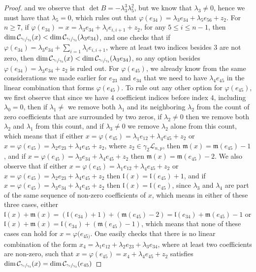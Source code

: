 \documentclass[12pt]{article}
\begin{document}
\begin{proof}
and we observe that $\det B=-\lambda_3^3\lambda_5^2$, but we know that $\lambda_3\neq 0$, hence we must have that $\lambda_5=0$, which rules out that $\varphi(e_{34})=\lambda_3 e_{34}+\lambda_5 e_{56}+z_2$. For $n\geq 7$, if $\varphi(e_{34})=x=\lambda_3 e_{34}+\lambda_i e_{i,i+1}+z_2$, for any $5\leq i\leq n-1$, then $\dim\mathcal{C}_{\sfrac{\gamma_1}{\gamma_3}}(x)<\dim\mathcal{C}_{\sfrac{\gamma_1}{\gamma_3}}(\lambda_3 e_{34})$, and one checks that if $\varphi(e_{34})=\lambda_3 e_{34}+\sum_{i=1}\lambda_i e_{i,i+1}$, where at least two indices besides $3$ are not zero, then $\dim\mathcal{C}_{\sfrac{\gamma_1}{\gamma_3}}(x)<\dim\mathcal{C}_{\sfrac{\gamma_1}{\gamma_3}}(\lambda_3 e_{34})$, so any option besides $\varphi(e_{34})=\lambda_3 e_{34}+z_2$ is ruled out. For $\varphi(e_{45})$, we already know from the same considerations we made earlier for $e_{23}$ and $e_{34}$ that we need to have $\lambda_4 e_{45}$ in the linear combination that forms $\varphi(e_{45})$. To rule out any other option for $\varphi(e_{45})$, we first observe that since we have $4$ coefficient indices before index $4$, including $\lambda_0=0$, then if $\lambda_1\neq$ we remove both $\lambda_1$ and its neighboring $\lambda_2$ from the count of zero coefficients that are surrounded by two zeros, if $\lambda_2\neq 0$ then we remove both $\lambda_2$ and $\lambda_1$ from this count, and if $\lambda_3\neq 0$ we remove $\lambda_2$ alone from this count, which means that if either $x=\varphi(e_{45})=\lambda_1 e_{12}+\lambda_4 e_{45}+z_2$ or $x=\varphi(e_{45})=\lambda_2 e_{23}+\lambda_4 e_{45}+z_2$, where $z_2\in\gamma_2\mathcal{L}_{n,p}$, then $\mathfrak{m}(x)=\mathfrak{m}(e_{45})-1$, and if $x=\varphi(e_{45})=\lambda_3 e_{34}+\lambda_4 e_{45}+z_2$ then $\mathfrak{m}(x)=\mathfrak{m}(e_{45})-2$. We also observe that if either $x=\varphi(e_{45})=\lambda_1 e_{12}+\lambda_4 e_{45}+z_2$ or $x=\varphi(e_{45})=\lambda_2 e_{23}+\lambda_4 e_{45}+z_2$ then $\mathfrak{l}(x)=\mathfrak{l}(e_{45})+1$, and if $x=\varphi(e_{45})=\lambda_3 e_{34}+\lambda_4 e_{45}+z_2$ then $\mathfrak{l}(x)=\mathfrak{l}(e_{45})$, since $\lambda_3$ and $\lambda_4$ are part of the same sequence of non-zero coefficients of $x$, which means in either of these three cases, either $\mathfrak{l}(x)+\mathfrak{m}(x)=(\mathfrak{l}(e_{34})+1)+(\mathfrak{m}(e_{45})-2)=\mathfrak{l}(e_{34})+\mathfrak{m}(e_{45})-1$ or $\mathfrak{l}(x)+\mathfrak{m}(x)=\mathfrak{l}(e_{34})+(\mathfrak{m}(e_{45})-1)$, which means that none of these cases can hold for $x=\varphi(e_{45)}$. One easily checks that there is no linear combination of the form $x_4=\lambda_1 e_{12}+\lambda_2 e_{23}+\lambda_3 e_{34}$, where at least two coefficients are non-zero, such that $x=\varphi(e_{45})=x_4+\lambda_4 e_{45}+z_2$ satisfies $\dim\mathcal{C}_{\sfrac{\gamma_1}{\gamma_3}}(x)=\dim\mathcal{C}_{\sfrac{\gamma_1}{\gamma_3}}(e_{45})$




\end{proof}
\end{document}

